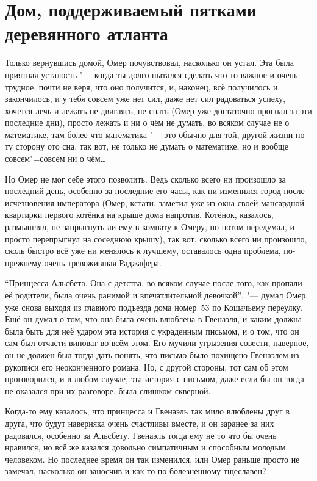 \section{Дом, поддерживаемый пятками деревянного атланта}

Только вернувшись домой, Омер почувствовал, насколько он устал.
Эта была приятная усталость "--- когда ты долго пытался сделать что-то важное и
очень трудное, почти не веря, что оно получится, и, наконец, всё получилось и
закончилось, и у тебя совсем уже нет сил, даже нет сил радоваться успеху,
хочется лечь и лежать не двигаясь, не спать (Омер уже достаточно проспал за эти
последние дни), просто лежать и ни о чём не думать, во всяком случае не о
математике, там более что математика "--- это обычно для той, другой жизни по ту
сторону ото сна, так вот, не только не думать о математике, но и вообще
совсем"=совсем ни о чём\ldots

Но Омер не мог себе этого позволить.
Ведь сколько всего ни произошло за последний день, особенно за последние его
часы, как ни изменился город после исчезновения императора (Омер, кстати,
заметил уже из окна своей мансардной квартирки первого котёнка на крыше дома
напротив. Котёнок, казалось, размышлял, не запрыгнуть ли ему в комнату к Омеру,
но потом передумал, и просто перепрыгнул на соседнюю крышу), так вот, сколько
всего ни произошло, сколь быстро всё уже ни менялось к лучшему, оставалось одна
проблема, по-прежнему очень тревожившая Раджафера.

\enquote{Принцесса Альсбета.
Она с детства, во всяком случае после того, как пропали её родители, была очень
ранимой и впечатлительной девочкой}, "--- думал Омер, уже снова выходя из
главного подъезда дома номер~53 по Кошачьему переулку.
Ещё он думал о том, что она была очень влюблена в Гвенаэля, и каким должна была
быть для неё ударом эта история с украденным письмом, и о том, что он сам был
отчасти виноват во всём этом.
Его мучили угрызения совести, наверное, он не должен был тогда дать понять, что
письмо было похищено Гвенаэлем из рукописи его неоконченного романа.
Но, с другой стороны, тот сам об этом проговорился, и в любом случае, эта
история с письмом, даже если бы он тогда не оказался при их разговоре, была
слишком скверной.

Когда-то ему казалось, что принцесса и Гвенаэль так мило влюблены друг в друга,
что будут наверняка очень счастливы вместе, и он заранее за них радовался,
особенно за Альсбету.
Гвенаэль тогда ему не то что бы очень нравился, но всё же казался довольно
симпатичным и способным молодым человеком.
Но последнее время он так изменился, или Омер раньше просто не замечал,
насколько он заносчив и как-то по-болезненному тщеславен?

